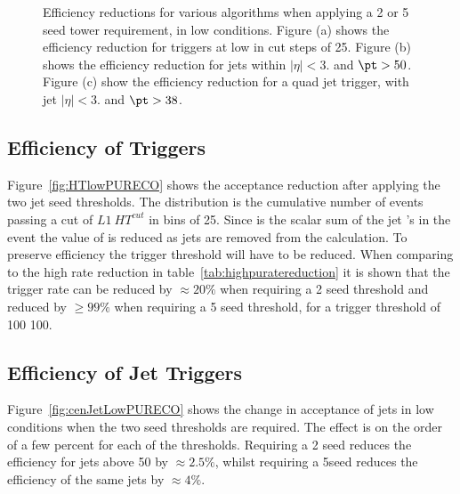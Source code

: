 \begin{figure}[h!]
    \centering
     \newline
    \caption{Efficiency reductions for various \Lone algorithms when applying a 
    2 or \unit{5}{\GeV} seed tower requirement, in low \pu 
    conditions. Figure (a) shows the efficiency reduction for \HT triggers at 
    low \pu in cut steps of \unit{25}{\GeV}. Figure (b) 
    shows the efficiency reduction for jets within $|\eta| <3.$ and $\pt > 
    50$\GeV. Figure (c) show the efficiency reduction for a quad jet trigger, 
    with jet $|\eta| <3.$ and $\pt > 38$\GeV.}
    \label{fig:lowpuratereductionRECO}
\end{figure}



\subsection{Efficiency of \HT Triggers} %
\label{par:Efficneicy of HT triggers}
Figure~\ref{fig:HTlowPURECO} shows the acceptance reduction after applying the 
two jet seed thresholds. The distribution is the cumulative number of events 
passing a cut of $L1~HT^{cut}$ in bins of \unit{25}{\GeV}. Since \HT is the 
scalar sum of the jet \PT's in the event the value of \Lone \HT is reduced as 
jets are removed from the calculation. To preserve efficiency the \Lone trigger 
threshold will have to be reduced. When comparing to the high \pu rate 
reduction in table~\ref{tab:highpuratereduction} it is shown that the trigger 
rate can be reduced by $\approx 20\%$ when requiring a \unit{2}{\GeV} seed 
threshold and reduced by $\geq 99\%$ when requiring a \unit{5}{\GeV} seed 
threshold, for a trigger threshold of 100 \unit{100}{\GeV}.


\subsection{Efficiency of Jet Triggers} %
\label{par:Efficiency of Jet Triggers}
Figure~\ref{fig:cenJetLowPURECO} shows the change in acceptance of jets in low 
\pu conditions when the two seed thresholds are required. The effect is on 
the order of a few percent for each of the thresholds. Requiring a 
\unit{2}{\GeV} seed reduces the efficiency for jets above \unit{50}{\GeV} by 
$\approx 2.5\%$, whilst requiring a 5\GeV seed reduces the efficiency of the 
same jets by $\approx 4\%$.

